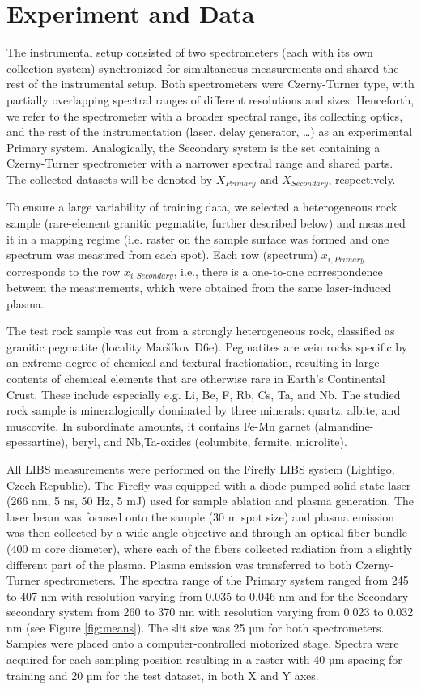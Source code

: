 \documentclass[preprint,11pt]{elsarticle}
\begin{document}
\section{Experiment and Data}
\label{sec:Data}
\noindent
The instrumental setup consisted of two spectrometers (each with its own collection system) synchronized for simultaneous measurements and shared the rest of the instrumental setup. Both spectrometers were Czerny-Turner type, with partially overlapping spectral ranges of different resolutions and sizes. Henceforth, we refer to the spectrometer with a broader spectral range, its collecting optics, and the rest of the instrumentation (laser, delay generator, …) as an experimental Primary system. Analogically, the Secondary system is the set containing a Czerny-Turner spectrometer with a narrower spectral range and shared parts. The collected datasets will be denoted by $X_{Primary}$ and $X_{Secondary}$, respectively.


To ensure a large variability of training data, we selected a heterogeneous rock sample (rare-element granitic pegmatite, further described below) and measured it in a mapping regime (i.e. raster on the sample surface was formed and one spectrum was measured from each spot).  Each row (spectrum) $x_{i, Primary}$ corresponds to the row $x_{i, Secondary}$, i.e., there is a one-to-one correspondence between the measurements, which were obtained from the same laser-induced plasma.

The test rock sample was cut from a strongly heterogeneous rock, classified as granitic pegmatite (locality Maršíkov D6e). Pegmatites are vein rocks specific by an extreme degree of chemical and textural fractionation, resulting in large contents of chemical elements that are otherwise rare in Earth's Continental Crust. These include especially e.g. Li, Be, F, Rb, Cs, Ta, and Nb. The studied rock sample is mineralogically dominated by three minerals: quartz, albite, and muscovite. In subordinate amounts, it contains Fe-Mn garnet (almandine-spessartine), beryl, and Nb,Ta-oxides (columbite, fermite, microlite).

	
All LIBS measurements were performed on the Firefly LIBS system (Lightigo, Czech Republic). The Firefly was equipped with a diode-pumped solid-state laser (266 nm, 5 ns, 50 Hz, 5 mJ) used for sample ablation and plasma generation. The laser beam was focused onto the sample (30 \textmu m spot size) and plasma emission was then collected by a wide-angle objective and through an optical fiber bundle (400 \textmu m core diameter), where each of the fibers collected radiation from a slightly different part of the plasma. Plasma emission was transferred to both Czerny-Turner spectrometers. The spectra range of the  Primary system ranged from 245 to 407 nm with resolution varying from 0.035 to 0.046 nm and for the Secondary secondary system from 260 to 370 nm with resolution varying from 0.023 to 0.032 nm (see Figure \ref{fig:means}). The slit size was 25 µm for both spectrometers. Samples were placed onto a computer-controlled motorized stage. Spectra were acquired for each sampling position resulting in a raster with 40 µm spacing for training and 20 µm for the test dataset, in both X and Y axes.
\end{document}
